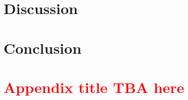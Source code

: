\documentclass[twocolumn, twoside, 10pt]{article}
\begin{document}
\section{Discussion}


\section{Conclusion}


\clearpage

\onecolumn
\printbibliography[
heading=bibnumbered, title=References]
\clearpage

\appendix
\section{\textcolor{red}{Appendix title TBA here}}

\clearpage

% 

% 

% 
\end{document}
